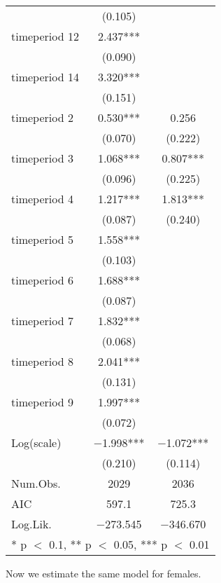 \documentclass[
]{article}
\begin{document}
\begin{table}[!h]
\begin{tabular}[t]{lcc}
 & (\num{0.105}) & \\
timeperiod 12 & \num{2.437}*** & \\
 & (\num{0.090}) & \\
timeperiod 14 & \num{3.320}*** & \\
 & (\num{0.151}) & \\
timeperiod 2 & \num{0.530}*** & \num{0.256}\\
 & (\num{0.070}) & (\num{0.222})\\
timeperiod 3 & \num{1.068}*** & \num{0.807}***\\
 & (\num{0.096}) & (\num{0.225})\\
timeperiod 4 & \num{1.217}*** & \num{1.813}***\\
 & (\num{0.087}) & (\num{0.240})\\
timeperiod 5 & \num{1.558}*** & \\
 & (\num{0.103}) & \\
timeperiod 6 & \num{1.688}*** & \\
 & (\num{0.087}) & \\
timeperiod 7 & \num{1.832}*** & \\
 & (\num{0.068}) & \\
timeperiod 8 & \num{2.041}*** & \\
 & (\num{0.131}) & \\
timeperiod 9 & \num{1.997}*** & \\
 & (\num{0.072}) & \\
Log(scale) & \num{-1.998}*** & \num{-1.072}***\\
 & (\num{0.210}) & (\num{0.114})\\
\midrule
Num.Obs. & \num{2029} & \num{2036}\\
AIC & \num{597.1} & \num{725.3}\\
Log.Lik. & \num{-273.545} & \num{-346.670}\\
\bottomrule
\multicolumn{3}{l}{\rule{0pt}{1em}* p $<$ 0.1, ** p $<$ 0.05, *** p $<$ 0.01}\\
\end{tabular}
\end{table}

\clearpage

Now we estimate the same model for females.
\end{document}
